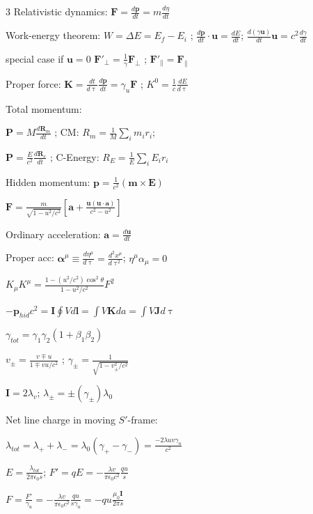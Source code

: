 \documentclass[a4paper,twoside]{article}
\begin{document}
\begin{multicols*}{3}
Relativistic dynamics:
\(\bm F = \frac{d\bm p}{dt} = m \frac{d\eta}{dt}\)

Work-energy theorem:
\(W = \Delta E = E_f - E_i\) ; \(\frac{d\bm p}{dt} \cdot \bm u = \frac{dE}{dt}\);
\(\frac{d(\gamma \bm u)}{dt}\bm u = c^2\frac{d\gamma}{dt}\)

special case if \(\bm u = 0\)
\(\bm F'_{\perp} = \frac{1}{\gamma} \bm F_{\perp}\) ; \(\bm F'_{\parallel} = \bm F_{\parallel}\)

Proper force:
\(\bm K = \frac{dt}{d\uptau} \frac{d\bm p}{dt} = \gamma_u \bm F\) ; \(K^0 = \frac{1}{c} \frac{dE}{d\uptau}\)

Total momentum:

\(\bm P = M \frac{d \bm R_m}{dt}\) ; CM: \(R_m = \frac{1}{M} \sum_i m_i r_i\);

\(\bm P = \frac{E}{c^2} \frac{d\bm R_e}{dt}\) ;  C-Energy: \(R_E = \frac{1}{E} \sum_i E_i r_i\)

Hidden momentum:
\(\bm p = \frac{1}{c^2} (\bm m\times \bm E )\)

\(\bm F = \frac{m}{\sqrt{1-u^2/c^2}}[\bm a + \frac{\bm u (\bm u \cdot \bm a)}{c^2-u^2}]\)

Ordinary acceleration:
\(\bm a = \frac{d\bm u}{dt}\)

Proper acc:
\(\bm \alpha^\mu \equiv \frac{d\eta^\mu}{d \uptau} = \frac{d^2 x^\mu}{d \uptau^2}\);
\(\eta^\mu \alpha_\mu = 0\)

\(K_\mu K^\mu = \frac{1 - (u^2/c^2) \cos^2 \theta}{1 - u^2/c^2} F^2 \)

\(-\bm p_{hid} c^2 = \bm I \oint V d\bm l = \int V \bm K da =  \int V \bm J d\uptau\)


\(\gamma_{tot} = \gamma_1 \gamma_2 (1 + \beta_1 \beta_2)\)

\(v_\pm = \frac{v \mp u}{1 \mp vu/c^2}\) ; \(\gamma_\pm = \frac{1}{\sqrt{1 - v_\pm^2/c^2}}\)

\(\bm I = 2 \lambda_v \); \(\lambda_\pm = \pm (\gamma_\pm) \lambda_0\)


Net line charge in moving \(S'\)-frame:

\(\lambda_{tot} = \lambda_+ + \lambda_- = \lambda_0 (\gamma_+ - \gamma_-) = \frac{-2 \lambda uv\gamma_u}{c^2}\)

\(E = \frac{\lambda_{tot}}{2 \pi \epsilon_0 s}\);
\(F' = qE = - \frac{\lambda v}{\pi \epsilon_0 c^2} \frac{qu}{s}\)

\(F = \frac{F'}{\gamma_u} = - \frac{\lambda v}{\pi \epsilon_0 c^2} \frac{qu}{s \gamma_u} = -qu \frac{\mu_0 \bm I}{2 \pi s}\)




\end{multicols*}
\end{document}
